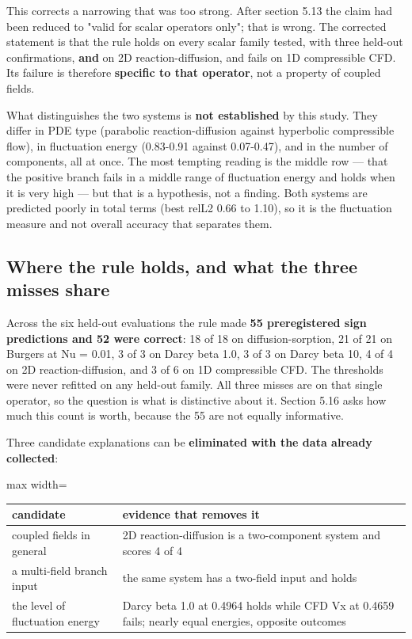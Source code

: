 \documentclass[preprint,12pt]{elsarticle}
\begin{document}
This corrects a narrowing that was too strong. After section 5.13 the claim had been reduced to "valid for scalar operators only"; that is wrong. The corrected statement is that the rule holds on every scalar family tested, with three held-out confirmations, \textbf{and} on 2D reaction-diffusion, and fails on 1D compressible CFD. Its failure is therefore \textbf{specific to that operator}, not a property of coupled fields.

What distinguishes the two systems is \textbf{not established} by this study. They differ in PDE type (parabolic reaction-diffusion against hyperbolic compressible flow), in fluctuation energy (0.83-0.91 against 0.07-0.47), and in the number of components, all at once. The most tempting reading is the middle row --- that the positive branch fails in a middle range of fluctuation energy and holds when it is very high --- but that is a hypothesis, not a finding. Both systems are predicted poorly in total terms (best relL2 0.66 to 1.10), so it is the fluctuation measure and not overall accuracy that separates them.

\subsection{Where the rule holds, and what the three misses share}

Across the six held-out evaluations the rule made \textbf{55 preregistered sign predictions and 52 were correct}: 18 of 18 on diffusion-sorption, 21 of 21 on Burgers at Nu = 0.01, 3 of 3 on Darcy beta 1.0, 3 of 3 on Darcy beta 10, 4 of 4 on 2D reaction-diffusion, and 3 of 6 on 1D compressible CFD. The thresholds were never refitted on any held-out family. All three misses are on that single operator, so the question is what is distinctive about it. Section 5.16 asks how much this count is worth, because the 55 are not equally informative.

Three candidate explanations can be \textbf{eliminated with the data already collected}:

\begin{center}
\begin{adjustbox}{max width=\linewidth}
\small
\begin{tabular}{ll}
\toprule
candidate & evidence that removes it \\
\midrule
coupled fields in general & 2D reaction-diffusion is a two-component system and scores 4 of 4 \\
a multi-field branch input & the same system has a two-field input and holds \\
the level of fluctuation energy & Darcy beta 1.0 at 0.4964 holds while CFD Vx at 0.4659 fails; nearly equal energies, opposite outcomes \\
\bottomrule
\end{tabular}
\end{adjustbox}
\end{center}
\end{document}

